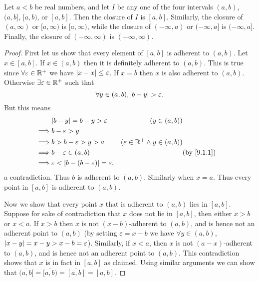 \begin{lem}\label{9.1.12}
	Let \(a < b\) be real numbers, and let \(I\) be any one of the four intervals \((a, b)\), \((a, b]\), \([a, b)\), or \([a, b]\).
	Then the closure of \(I\) is \([a, b]\).
	Similarly, the closure of \((a, \infty)\) or \([a, \infty)\) is \([a, \infty)\), while the closure of \((-\infty, a)\) or \((-\infty, a]\) is \((-\infty, a]\).
	Finally, the closure of \((-\infty, \infty)\) is \((-\infty, \infty)\).
\end{lem}

\begin{proof}
	First let us show that every element of \([a, b]\) is adherent to \((a, b)\).
	Let \(x \in [a, b]\).
	If \(x \in (a, b)\) then it is definitely adherent to \((a, b)\).
	This is true since \(\forall \varepsilon \in \mathbb{R}^+\) we have \(\left\lvert x - x\right\rvert \leq \varepsilon\).
	If \(x = b\) then \(x\) is also adherent to \((a, b)\).
	Otherwise \(\exists \varepsilon \in \mathbb{R}^+\) such that
	\[
		\forall y \in (a, b), \left\lvert b - y\right\rvert > \varepsilon.
	\]
	But this means
	\begin{align*}
		         & \abs{b - y} = b - y > \varepsilon                        & (y \in (a, b))                                         \\
		\implies & b - \varepsilon > y                                                                                               \\
		\implies & b > b - \varepsilon > y > a                              & (\varepsilon \in \R^+ \land y \in (a, b))              \\
		\implies & b - \varepsilon \in (a, b)                               &                                           & \by{9.1.1} \\
		\implies & \varepsilon < \abs{b - (b - \varepsilon)} = \varepsilon,
	\end{align*}
	a contradiction.
	Thus \(b\) is adherent to \((a, b)\).
	Similarly when \(x = a\).
	Thus every point in \([a, b]\) is adherent to \((a, b)\).

	Now we show that every point \(x\) that is adherent to \((a, b)\) lies in \([a, b]\).
	Suppose for sake of contradiction that \(x\) does not lie in \([a, b]\), then either \(x > b\) or \(x < a\).
	If \(x > b\) then \(x\) is not \((x - b)\)-adherent to \((a, b)\), and is hence not an adherent point to \((a, b)\)
	(by setting \(\varepsilon = x - b\) we have \(\forall y \in (a, b)\), \(\left\lvert x - y\right\rvert = x - y > x - b = \varepsilon\)).
	Similarly, if \(x < a\), then \(x\) is not \((a - x)\)-adherent to \((a, b)\), and is hence not an adherent point to \((a, b)\).
	This contradiction shows that \(x\) is in fact in \([a, b]\) as claimed.
	Using similar arguments we can show that \(\overline{(a, b]} = \overline{[a, b)} = \overline{[a, b]} = [a, b]\).


\end{proof}
